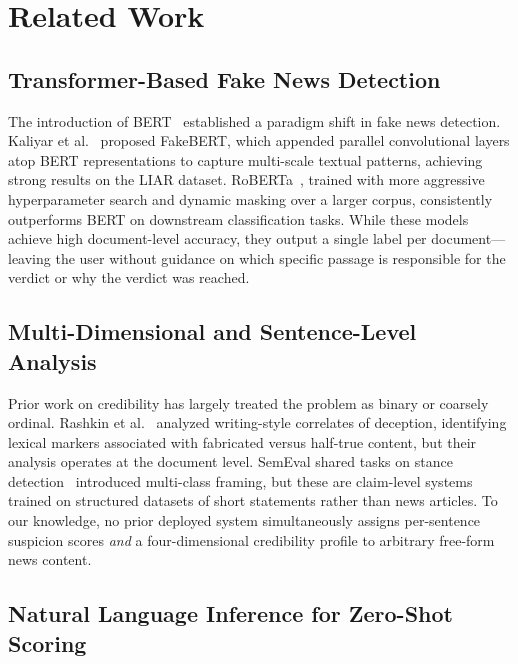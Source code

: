 \documentclass[journal]{IEEEtran}
\begin{document}
\section{Related Work}
\label{sec:related}

\subsection{Transformer-Based Fake News Detection}

The introduction of BERT~\cite{devlin2019bert} established a paradigm shift in fake news
detection. Kaliyar et al.~\cite{kaliyar2021fakebert} proposed FakeBERT, which appended
parallel convolutional layers atop BERT representations to capture multi-scale textual
patterns, achieving strong results on the LIAR dataset. RoBERTa~\cite{liu2019roberta},
trained with more aggressive hyperparameter search and dynamic masking over a larger corpus,
consistently outperforms BERT on downstream classification tasks. While these models achieve
high document-level accuracy, they output a single label per document—leaving the user
without guidance on which specific passage is responsible for the verdict or why the verdict
was reached.

\subsection{Multi-Dimensional and Sentence-Level Analysis}

Prior work on credibility has largely treated the problem as binary or coarsely ordinal.
Rashkin et al.~\cite{rashkin2017truth} analyzed writing-style correlates of deception,
identifying lexical markers associated with fabricated versus half-true content, but their
analysis operates at the document level. SemEval shared tasks on stance
detection~\cite{mohammad2016semeval} introduced multi-class framing, but these are
claim-level systems trained on structured datasets of short statements rather than news
articles. To our knowledge, no prior deployed system simultaneously assigns per-sentence
suspicion scores \textit{and} a four-dimensional credibility profile to arbitrary free-form
news content.

\subsection{Natural Language Inference for Zero-Shot Scoring}
\end{document}
